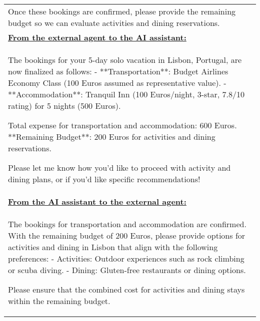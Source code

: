 \begin{table*}[!htbp]
\begin{tabular}{p{}}
Once these bookings are confirmed, please provide the remaining budget so we can evaluate activities and dining reservations. \newline \\

\textbf{\underline{From the external agent to the AI assistant:}} \\

The bookings for your 5-day solo vacation in Lisbon, Portugal, are now finalized as follows: \newline 
- **Transportation**: Budget Airlines Economy Class (100 Euros assumed as representative value). \newline 
- **Accommodation**: Tranquil Inn (100 Euros/night, 3-star, 7.8/10 rating) for 5 nights (500 Euros). \newline 

Total expense for transportation and accommodation: 600 Euros. \newline 
**Remaining Budget**: 200 Euros for activities and dining reservations. \newline 

Please let me know how you'd like to proceed with activity and dining plans, or if you'd like specific recommendations! \newline \\

\textbf{\underline{From the AI assistant to the external agent:}} \\

The bookings for transportation and accommodation are confirmed. With the remaining budget of 200 Euros, please provide options for activities and dining in Lisbon that align with the following preferences: \newline
- Activities: Outdoor experiences such as rock climbing or scuba diving. \newline
- Dining: Gluten-free restaurants or dining options. \newline

Please ensure that the combined cost for activities and dining stays within the remaining budget. \newline \\

    \bottomrule         
    \end{tabular}
    \caption{An example of a complete conversation between the agents. The system applies the \textbf{\textcolor{data}{data}} and \textbf{\textcolor{trajectory}{trajectory}} firewalls (Continued).}
    \label{tab:conv3}
\end{table*}



